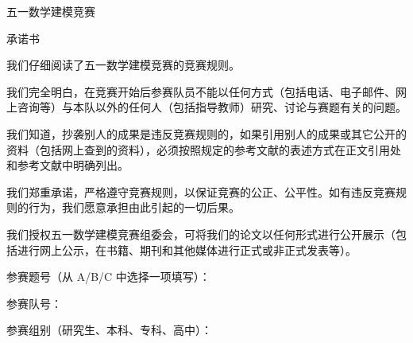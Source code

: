 \thispagestyle{plain}

\vspace*{0.1em}

\begin{center}
  {\yahei{} 五一数学建模竞赛}
\end{center}

\vspace{0.4em}

\begin{center}
  {\heiti{} 承\quad 诺\quad 书}
\end{center}

\vspace{1.0em}

我们仔细阅读了五一数学建模竞赛的竞赛规则。

我们完全明白，在竞赛开始后参赛队员不能以任何方式（包括电话、电子邮件、网上咨询等）与本队以外的任何人（包括指导教师）研究、讨论与赛题有关的问题。

我们知道，抄袭别人的成果是违反竞赛规则的，如果引用别人的成果或其它公开的资料（包括网上查到的资料），必须按照规定的参考文献的表述方式在正文引用处和参考文献中明确列出。

我们郑重承诺，严格遵守竞赛规则，以保证竞赛的公正、公平性。如有违反竞赛规则的行为，我们愿意承担由此引起的一切后果。

我们授权五一数学建模竞赛组委会，可将我们的论文以任何形式进行公开展示（包括进行网上公示，在书籍、期刊和其他媒体进行正式或非正式发表等）。

\vspace{1.1em}

\noindent 参赛题号（从 A/B/C 中选择一项填写）：\underline{\makebox[7.5cm][c]{[在此填写题号]}}

\vspace{0.65em}

\noindent 参赛队号：\underline{\makebox[11.5cm][c]{[在此填写队号]}}

\vspace{0.65em}

\noindent 参赛组别（研究生、本科、专科、高中）：\underline{\makebox[7.0cm][c]{[在此选择组别]}}

\vspace{0.65em}

